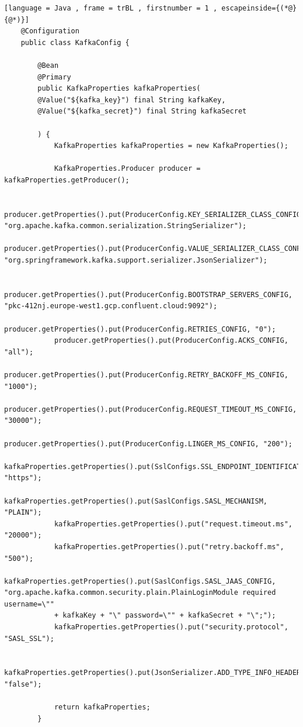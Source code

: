     \begin{lstlisting}[language = Java , frame = trBL , firstnumber = 1 , escapeinside={(*@}{@*)}]
    @Configuration
    public class KafkaConfig {
        
        @Bean
        @Primary
        public KafkaProperties kafkaProperties(
        @Value("${kafka_key}") final String kafkaKey,
        @Value("${kafka_secret}") final String kafkaSecret
        
        ) {
            KafkaProperties kafkaProperties = new KafkaProperties();
            
            KafkaProperties.Producer producer = kafkaProperties.getProducer();
            
            producer.getProperties().put(ProducerConfig.KEY_SERIALIZER_CLASS_CONFIG, "org.apache.kafka.common.serialization.StringSerializer");
            producer.getProperties().put(ProducerConfig.VALUE_SERIALIZER_CLASS_CONFIG, "org.springframework.kafka.support.serializer.JsonSerializer");
            
            producer.getProperties().put(ProducerConfig.BOOTSTRAP_SERVERS_CONFIG, "pkc-412nj.europe-west1.gcp.confluent.cloud:9092");
            producer.getProperties().put(ProducerConfig.RETRIES_CONFIG, "0");
            producer.getProperties().put(ProducerConfig.ACKS_CONFIG, "all");
            producer.getProperties().put(ProducerConfig.RETRY_BACKOFF_MS_CONFIG, "1000");
            producer.getProperties().put(ProducerConfig.REQUEST_TIMEOUT_MS_CONFIG, "30000");
            producer.getProperties().put(ProducerConfig.LINGER_MS_CONFIG, "200");
            kafkaProperties.getProperties().put(SslConfigs.SSL_ENDPOINT_IDENTIFICATION_ALGORITHM_CONFIG, "https");
            kafkaProperties.getProperties().put(SaslConfigs.SASL_MECHANISM, "PLAIN");
            kafkaProperties.getProperties().put("request.timeout.ms", "20000");
            kafkaProperties.getProperties().put("retry.backoff.ms", "500");
            kafkaProperties.getProperties().put(SaslConfigs.SASL_JAAS_CONFIG, "org.apache.kafka.common.security.plain.PlainLoginModule required username=\""
            + kafkaKey + "\" password=\"" + kafkaSecret + "\";");
            kafkaProperties.getProperties().put("security.protocol", "SASL_SSL");
            
            kafkaProperties.getProperties().put(JsonSerializer.ADD_TYPE_INFO_HEADERS, "false");
            
            return kafkaProperties;
        }
            \end{lstlisting}
            
